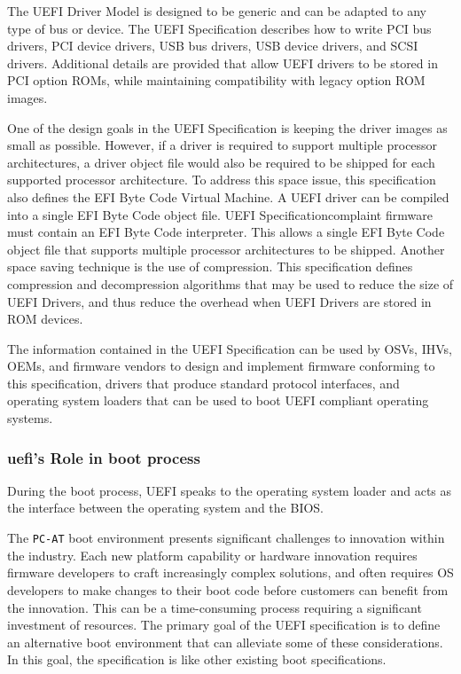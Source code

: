 The UEFI Driver Model is designed to be generic and can be adapted to any type of bus or
device. The UEFI Specification describes how to write PCI bus drivers, PCI device drivers, USB
bus drivers, USB device drivers, and SCSI drivers. Additional details are provided that allow UEFI
drivers to be stored in PCI option ROMs, while maintaining compatibility with legacy option ROM
images.

One of the design goals in the UEFI Specification is keeping the driver images as small as
possible. However, if a driver is required to support multiple processor architectures, a driver
object file would also be required to be shipped for each supported processor architecture. To
address this space issue, this specification also defines the EFI Byte Code Virtual Machine. A
UEFI driver can be compiled into a single EFI Byte Code object file. UEFI Specificationcomplaint firmware must contain an EFI Byte Code interpreter. This allows a single EFI Byte
Code object file that supports multiple processor architectures to be shipped. Another space saving
technique is the use of compression. This specification defines compression and decompression
algorithms that may be used to reduce the size of UEFI Drivers, and thus reduce the overhead
when UEFI Drivers are stored in ROM devices.

The information contained in the UEFI Specification can be used by OSVs, IHVs, OEMs,
and firmware vendors to design and implement firmware conforming to this specification, drivers
that produce standard protocol interfaces, and operating system loaders that can be used to boot
UEFI compliant operating systems.

\subsubsection{\gls{uefi}'s Role in boot process}

During the boot process, UEFI speaks to the operating system loader and acts as the interface between the operating system and the BIOS.

The \verb|PC-AT| boot environment presents significant challenges to innovation within the
industry. Each new platform capability or hardware innovation requires firmware developers to
craft increasingly complex solutions, and often requires OS developers to make changes to their
boot code before customers can benefit from the innovation. This can be a time-consuming process
requiring a significant investment of resources. The primary goal of the UEFI specification is to
define an alternative boot environment that can alleviate some of these considerations. In this goal, the specification is like other existing boot specifications.

